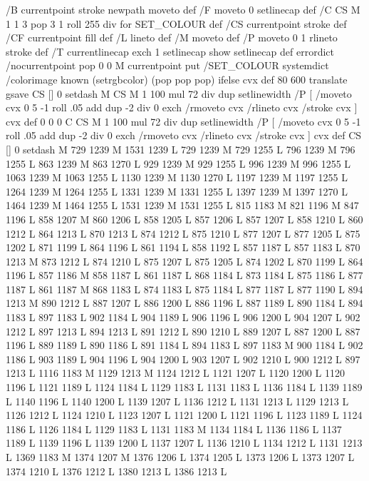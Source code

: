 {{{{{{{{{{{{{{{{{{{{{{{{/B { currentpoint stroke newpath moveto } def
/F { moveto 0 setlinecap} def
/C { CS M 1 1 3 { pop 3 1 roll 255 div } for SET_COLOUR } def
/CS { currentpoint stroke } def
/CF { currentpoint fill } def
/L { lineto } def /M { moveto } def
/P { moveto 0 1 rlineto stroke } def
/T { currentlinecap exch 1 setlinecap show setlinecap } def
errordict /nocurrentpoint { pop 0 0 M currentpoint } put
/SET_COLOUR systemdict /colorimage known
{ (setrgbcolor) } { (pop pop pop) } ifelse cvx def
 80 600 translate
gsave
CS [] 0 setdash M
CS M 1 100 mul 72 div dup setlinewidth
/P [ /moveto cvx 0 5 -1 roll .05 add dup -2 div 0 exch /rmoveto cvx /rlineto cvx /stroke cvx ] cvx def
 0 0 0 C
CS M 1 100 mul 72 div dup setlinewidth
/P [ /moveto cvx 0 5 -1 roll .05 add dup -2 div 0 exch /rmoveto cvx /rlineto cvx /stroke cvx ] cvx def
CS [] 0 setdash M
729 1239 M 1531 1239 L
729 1239 M 729 1255 L
796 1239 M 796 1255 L
863 1239 M 863 1270 L
929 1239 M 929 1255 L
996 1239 M 996 1255 L
1063 1239 M 1063 1255 L
1130 1239 M 1130 1270 L
1197 1239 M 1197 1255 L
1264 1239 M 1264 1255 L
1331 1239 M 1331 1255 L
1397 1239 M 1397 1270 L
1464 1239 M 1464 1255 L
1531 1239 M 1531 1255 L
815 1183 M 821 1196 M 847 1196 L
858 1207 M 860 1206 L
858 1205 L
857 1206 L
857 1207 L
858 1210 L
860 1212 L
864 1213 L
870 1213 L
874 1212 L
875 1210 L
877 1207 L
877 1205 L
875 1202 L
871 1199 L
864 1196 L
861 1194 L
858 1192 L
857 1187 L
857 1183 L
870 1213 M 873 1212 L
874 1210 L
875 1207 L
875 1205 L
874 1202 L
870 1199 L
864 1196 L
857 1186 M 858 1187 L
861 1187 L
868 1184 L
873 1184 L
875 1186 L
877 1187 L
861 1187 M 868 1183 L
874 1183 L
875 1184 L
877 1187 L
877 1190 L
894 1213 M 890 1212 L
887 1207 L
886 1200 L
886 1196 L
887 1189 L
890 1184 L
894 1183 L
897 1183 L
902 1184 L
904 1189 L
906 1196 L
906 1200 L
904 1207 L
902 1212 L
897 1213 L
894 1213 L
891 1212 L
890 1210 L
889 1207 L
887 1200 L
887 1196 L
889 1189 L
890 1186 L
891 1184 L
894 1183 L
897 1183 M 900 1184 L
902 1186 L
903 1189 L
904 1196 L
904 1200 L
903 1207 L
902 1210 L
900 1212 L
897 1213 L
1116 1183 M 1129 1213 M 1124 1212 L
1121 1207 L
1120 1200 L
1120 1196 L
1121 1189 L
1124 1184 L
1129 1183 L
1131 1183 L
1136 1184 L
1139 1189 L
1140 1196 L
1140 1200 L
1139 1207 L
1136 1212 L
1131 1213 L
1129 1213 L
1126 1212 L
1124 1210 L
1123 1207 L
1121 1200 L
1121 1196 L
1123 1189 L
1124 1186 L
1126 1184 L
1129 1183 L
1131 1183 M 1134 1184 L
1136 1186 L
1137 1189 L
1139 1196 L
1139 1200 L
1137 1207 L
1136 1210 L
1134 1212 L
1131 1213 L
1369 1183 M 1374 1207 M 1376 1206 L
1374 1205 L
1373 1206 L
1373 1207 L
1374 1210 L
1376 1212 L
1380 1213 L
1386 1213 L
}}}}}}}}}}}}}}}}}}}}}}}}
